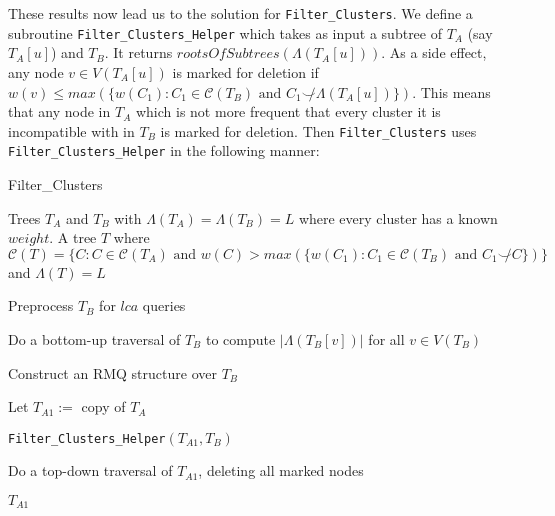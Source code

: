 \documentclass{article}
\newcommand{\compatible}{\smile}
\newcommand{\leafset}{\Lambda}
\begin{document}
    These results now lead us to the solution for \texttt{Filter\_Clusters}. We define a subroutine \texttt{Filter\_Clusters\_Helper} which takes as input a subtree of $T_A$ (say $T_A[u]$) and $T_B$. It returns $rootsOfSubtrees(\leafset(T_A[u]))$. As a side effect, any node $v \in V(T_A[u])$ is marked for deletion if $w(v) \leq max(\{w(C_1) : C_1 \in \mathcal{C}(T_B) \text{ and } C_1 \not\compatible \leafset(T_A[u])\})$. This means that any node in $T_A$ which is not more frequent that every cluster it is incompatible with in $T_B$ is marked for deletion. Then \texttt{Filter\_Clusters} uses \texttt{Filter\_Clusters\_Helper} in the following manner:

    \begin{algorithm}
        \caption{Filter\_Clusters}
        \begin{algorithmic}[1]
            \Input Trees $T_A$ and $T_B$ with $\leafset(T_A) = \leafset(T_B) = L$ where every cluster has a known $weight$.
            \Output A tree $T$ where $\mathcal{C}(T) = \{C : C \in \mathcal{C}(T_A) \text{ and } w(C) > max(\{w(C_1) : C_1 \in \mathcal{C}(T_B) \text{ and } C_1 \not\compatible C\})\}$ and $\leafset(T) = L$

            \State Preprocess $T_B$ for $lca$ queries

            \State Do a bottom-up traversal of $T_B$ to compute $|\leafset(T_B[v])|$ for all $v \in V(T_B)$

            \State Construct an RMQ structure over $T_B$

            \State Let $T_{A1} :=$ copy of $T_A$

            \State \texttt{Filter\_Clusters\_Helper}$(T_{A1}, T_B)$

            \State Do a top-down traversal of $T_{A1}$, deleting all marked nodes

            \State \Return $T_{A1}$
        \end{algorithmic}
    \end{algorithm}
\end{document}
